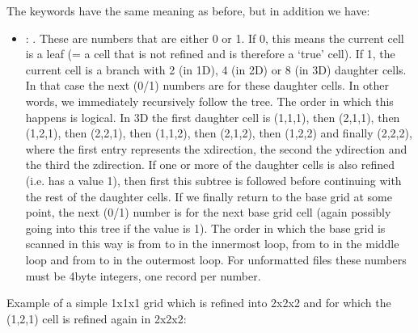 \documentclass[letterpaper,10pt,english]{sphinxmanual}
\begin{document}
The keywords have the same meaning as before, but in addition we have:
\begin{itemize}
\item {} 
:  . These are numbers that are either 0
or 1. If 0, this means the current cell is a leaf (= a cell that is not
refined and is therefore a ‘true’ cell). If 1, the current cell is a branch
with 2 (in 1\sphinxhyphen{}D), 4 (in 2\sphinxhyphen{}D) or 8 (in 3\sphinxhyphen{}D) daughter cells. In that case the
next (0/1) numbers are for these daughter cells. In other words, we
immediately recursively follow the tree. The order in which this happens is
logical. In 3\sphinxhyphen{}D the first daughter cell is (1,1,1), then (2,1,1), then
(1,2,1), then (2,2,1), then (1,1,2), then (2,1,2), then (1,2,2) and finally
(2,2,2), where the first entry represents the x\sphinxhyphen{}direction, the second the
y\sphinxhyphen{}direction and the third the z\sphinxhyphen{}direction. If one or more of the daughter
cells is also refined (i.e. has a value 1), then first this sub\sphinxhyphen{}tree is
followed before continuing with the rest of the daughter cells. If we finally
return to the base grid at some point, the next (0/1) number is for the next
base grid cell (again possibly going into this tree if the value is 1). The
order in which the base grid is scanned in this way is from  to  in
the innermost loop, from  to  in the middle loop and from  to
 in the outermost loop. For unformatted files these numbers must be
4\sphinxhyphen{}byte integers, one record per number.

\end{itemize}

Example of a simple 1x1x1 grid which is refined into 2x2x2 and for
which the (1,2,1) cell is refined again in 2x2x2:

\begin{sphinxVerbatim}[commandchars=\\\{\}]
    
    
  
  
  
  
\end{sphinxVerbatim}
\end{document}
